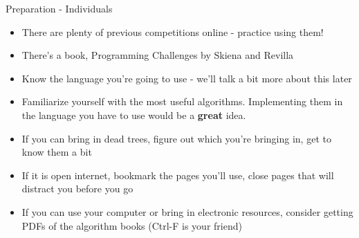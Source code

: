 \documentclass{beamer}
\begin{document}
\begin{frame}{Preparation - Individuals}
  \begin{centering}
    \begin{itemize}
      \item There are plenty of previous competitions online - practice using them!
      \item There's a book, Programming Challenges by Skiena and Revilla 
      \item Know the language you're going to use - we'll talk a bit more about this later
      \item Familiarize yourself with the most useful algorithms. Implementing them in the language you have to use would be a \textbf{great} idea.
      \item If you can bring in dead trees, figure out which you're bringing in, get to know them a bit
      \item If it is open internet, bookmark the pages you'll use, close pages that will distract you before you go
      \item If you can use your computer or bring in electronic resources, consider getting PDFs of the algorithm books (Ctrl-F is your friend)
    \end{itemize}
  \end{centering}
\end{frame}
\end{document}
